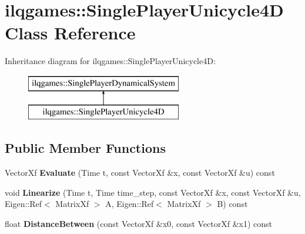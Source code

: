 \hypertarget{classilqgames_1_1_single_player_unicycle4_d}{}\section{ilqgames\+:\+:Single\+Player\+Unicycle4D Class Reference}
\label{classilqgames_1_1_single_player_unicycle4_d}
Inheritance diagram for ilqgames\+:\+:Single\+Player\+Unicycle4D\+:\begin{figure}[H]
\begin{center}
\leavevmode
\includegraphics[height=2.000000cm]{classilqgames_1_1_single_player_unicycle4_d}
\end{center}
\end{figure}
\subsection*{Public Member Functions}
\begin{DoxyCompactItemize}
\item 
Vector\+Xf {\bfseries Evaluate} (Time t, const Vector\+Xf \&x, const Vector\+Xf \&u) const \hypertarget{classilqgames_1_1_single_player_unicycle4_d_a2d09bc46b962db25724fe381d44ecd5f}{}\label{classilqgames_1_1_single_player_unicycle4_d_a2d09bc46b962db25724fe381d44ecd5f}

\item 
void {\bfseries Linearize} (Time t, Time time\+\_\+step, const Vector\+Xf \&x, const Vector\+Xf \&u, Eigen\+::\+Ref$<$ Matrix\+Xf $>$ A, Eigen\+::\+Ref$<$ Matrix\+Xf $>$ B) const \hypertarget{classilqgames_1_1_single_player_unicycle4_d_a1b433ba55fba0620c251215e5927fe06}{}\label{classilqgames_1_1_single_player_unicycle4_d_a1b433ba55fba0620c251215e5927fe06}

\item 
float {\bfseries Distance\+Between} (const Vector\+Xf \&x0, const Vector\+Xf \&x1) const \hypertarget{classilqgames_1_1_single_player_unicycle4_d_a8e07e462f3b1efe63ae0f14ee286d657}{}\label{classilqgames_1_1_single_player_unicycle4_d_a8e07e462f3b1efe63ae0f14ee286d657}

\end{DoxyCompactItemize}
